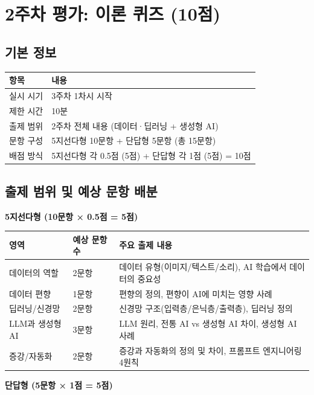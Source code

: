 \documentclass[a4paper,11pt]{ltjsarticle}
\begin{document}
\section{2주차 평가: 이론 퀴즈 (10점)}

\subsection{기본 정보}

\noindent
\begin{tabularx}{\textwidth}{|p{2.5cm}|X|}
\hline
\textbf{항목} & \textbf{내용} \\ \hline
실시 시기 & 3주차 1차시 시작 \\ \hline
제한 시간 & 10분 \\ \hline
출제 범위 & 2주차 전체 내용 (데이터·딥러닝 + 생성형 AI) \\ \hline
문항 구성 & 5지선다형 10문항 + 단답형 5문항 (총 15문항) \\ \hline
배점 방식 & 5지선다형 각 0.5점 (5점) + 단답형 각 1점 (5점) = 10점 \\ \hline
\end{tabularx}

\subsection{출제 범위 및 예상 문항 배분}

\textbf{5지선다형 (10문항 × 0.5점 = 5점)}

\noindent
\begin{tabularx}{\textwidth}{|p{3cm}|>{\centering\arraybackslash}p{2cm}|X|}
\hline
\textbf{영역} & \textbf{예상 문항 수} & \textbf{주요 출제 내용} \\ \hline
데이터의 역할 & 2문항 & 데이터 유형(이미지/텍스트/소리), AI 학습에서 데이터의 중요성 \\ \hline
데이터 편향 & 1문항 & 편향의 정의, 편향이 AI에 미치는 영향 사례 \\ \hline
딥러닝/신경망 & 2문항 & 신경망 구조(입력층/은닉층/출력층), 딥러닝 정의 \\ \hline
LLM과 생성형 AI & 3문항 & LLM 원리, 전통 AI vs 생성형 AI 차이, 생성형 AI 사례 \\ \hline
증강/자동화 & 2문항 & 증강과 자동화의 정의 및 차이, 프롬프트 엔지니어링 4원칙 \\ \hline
\end{tabularx}

\vspace{0.5em}
\textbf{단답형 (5문항 × 1점 = 5점)}
\end{document}
